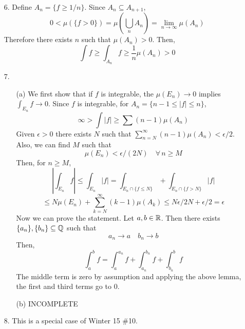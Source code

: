 \begin{itemize}
A more complicated proof by Walton:
\begin{proof}
Let $ c = \sum \|e_n-f_n\|^2 <1$. Define $T: \calh \to \calh$ by sending $x = \sum \lip x,e_n\rip e_n \mapsto \sum \lip x,e_n\rip f_n$. The second sum converges by the Bessel inequality. Now, by the Cauchy-schwarz inequality and Parseval's identity,
	\[ \| (I-T)x \|^2 = \left\| \sum \lip x ,e_n \rip (e_n-f_n) \right\|^2 \le \sum |\lip x,e_n\rip|^2 \sum \| e_n-f_n\|^2 = c\|x\|^2 \]
So, $\|T-I\| \le \sqrt{c} <1$. We claim that this means $T$ is invertible. Indeed, set
	\[ S = \sum_{n=0}^\infty (I-T)^n \]
The sum is absolutely convergent since $\|I-T\| <1$ so $S$ is bounded linear operator since $\call(\calh)$ is a Banach space. Moreover,
	\[ S-TS,S-ST = \sum_{n=1}^\infty (I-T)^n = S-(I-T)^0 = S-I \]
so $S=T^{-1}$. Now, let $y \in \calh$. Then, there exists $x$ ($T^{-1}y$) such that $Tx=y$. Therefore,
	\begin{equation}\label{exp} y = \sum \lip x,e_n\rip f_n \end{equation}
and therefore $\overline{\text{span}}\{f_n\} = \calh$.
\end{proof}
Remark: This acutally holds if $\sum \|e_n-f_n\|^2 < \infty$.

\item[6.] Define $A_n = \{ f \ge 1/n\}$. Since $A_n \subseteq A_{n+1}$,
		\[ 0 < \mu(\{f >0 \}) = \mu \left( \bigcup_n A_n \right) = \lim_{n \to \infty} \mu(A_n) \]
	Therefore there exists $n$ such that $\mu(A_n) >0$. Then,
		\[ \int f \ge \int_{A_n} f \ge \dfrac 1n \mu(A_n) > 0 \]

\item[7.] \begin{itemize}
		\item[(a)] We first show that if $f$ is integrable, the $\mu(E_n) \to 0$ implies $\int_{E_n} f \to 0$. Since $f$ is integrable, for $A_n = \{ n-1 \le |f| \le n \}$,
		\[ \infty > \int |f| \ge \sum (n-1)\mu(A_n) \]
		Given $\epsilon >0$ there exists $N$ such that $\sum_{n=N}^\infty (n-1) \mu(A_n) < \epsilon/2$. Also, we can find $M$ such that 
		\[ \mu(E_n) < \epsilon/(2N) \quad \forall \, n \ge M \]
		Then, for $n \ge M$,
		\[ \left|\int_{E_n} f\right| \le \int_{E_n} |f| = \int_{E_n \cap \{f \le N \} } + \int_{E_n \cap \{f > N\}} |f| \]
		\[\le N\mu(E_n) + \sum_{k=N}^\infty (k-1)\mu(A_k) \le N\epsilon/2N + \epsilon /2 = \epsilon \]
		Now we can prove the statement. Let $a,b \in \mathbb{R}$. Then there exists $\{a_n\},\{b_n\} \subseteq \mathbb{Q}$ such that
		\[ a_n \to a \quad b_n \to b \]
		Then,
		\[ \int_a^b f = \int_a^{a_n}f + \int_{a_n}^{b_n}f + \int_{b_n}^bf \]
		The middle term is zero by assumption and applying the above lemma, the first and third terms go to 0.
		\item[(b)] INCOMPLETE
	\end{itemize}

\item[8.] This is a special case of Winter 15 \#10.
\end{itemize}